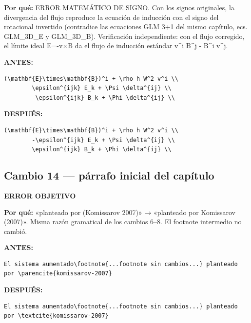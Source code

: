 \documentclass[11pt,a4paper]{article}
\begin{document}
\textbf{Por qué:} ERROR MATEMÁTICO DE SIGNO. Con los signos originales, la divergencia del flujo reproduce la ecuación de inducción con el signo del rotacional invertido (contradice las ecuaciones GLM 3+1 del mismo capítulo, ecs. GLM\_3D\_E y GLM\_3D\_B). Verificación independiente: con el flujo corregido, el límite ideal E=-v×B da el flujo de inducción estándar v\textasciicircum{}i B\textasciicircum{}j - B\textasciicircum{}i v\textasciicircum{}j.

\textcolor{antesline}{\textbf{ANTES:}}
\begin{Verbatim}[breaklines=true, breakanywhere=true, fontsize=\small, frame=leftline, rulecolor=\color{antesline}, framerule=1.2pt]
        (\mathbf{E}\times\mathbf{B})^i + \rho h W^2 v^i \\
        \epsilon^{ijk} E_k + \Psi \delta^{ij} \\
        -\epsilon^{ijk} B_k + \Phi \delta^{ij} \\
\end{Verbatim}
\textcolor{despline}{\textbf{DESPUÉS:}}
\begin{Verbatim}[breaklines=true, breakanywhere=true, fontsize=\small, frame=leftline, rulecolor=\color{despline}, framerule=1.2pt]
        (\mathbf{E}\times\mathbf{B})^i + \rho h W^2 v^i \\
        -\epsilon^{ijk} E_k + \Psi \delta^{ij} \\
        \epsilon^{ijk} B_k + \Phi \delta^{ij} \\
\end{Verbatim}

\subsection*{Cambio 14 --- párrafo inicial del capítulo}
\colorbox{okbg}{\textbf{\footnotesize ERROR OBJETIVO}}

\textbf{Por qué:} «planteado por (Komissarov 2007)» → «planteado por Komissarov (2007)». Misma razón gramatical de los cambios 6--8. El footnote intermedio no cambió.

\textcolor{antesline}{\textbf{ANTES:}}
\begin{Verbatim}[breaklines=true, breakanywhere=true, fontsize=\small, frame=leftline, rulecolor=\color{antesline}, framerule=1.2pt]
El sistema aumentado\footnote{...footnote sin cambios...} planteado por \parencite{komissarov-2007}
\end{Verbatim}
\textcolor{despline}{\textbf{DESPUÉS:}}
\begin{Verbatim}[breaklines=true, breakanywhere=true, fontsize=\small, frame=leftline, rulecolor=\color{despline}, framerule=1.2pt]
El sistema aumentado\footnote{...footnote sin cambios...} planteado por \textcite{komissarov-2007}
\end{Verbatim}
\end{document}
